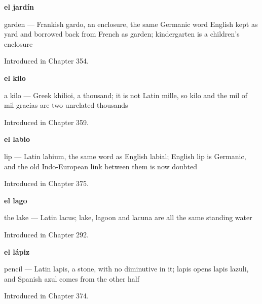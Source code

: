 \noindent\begin{minipage}[t]{\linewidth}
\raggedright
\textbf{el jardín}\par
\small garden — Frankish gardo, an enclosure, the same Germanic word English kept as yard and borrowed back from French as garden; kindergarten is a children's enclosure\par
\footnotesize Introduced in Chapter 354.
\end{minipage}\par\medskip

\noindent\begin{minipage}[t]{\linewidth}
\raggedright
\textbf{el kilo}\par
\small a kilo — Greek khilioi, a thousand; it is not Latin mille, so kilo and the mil of mil gracias are two unrelated thousands\par
\footnotesize Introduced in Chapter 359.
\end{minipage}\par\medskip

\noindent\begin{minipage}[t]{\linewidth}
\raggedright
\textbf{el labio}\par
\small lip — Latin labium, the same word as English labial; English lip is Germanic, and the old Indo-European link between them is now doubted\par
\footnotesize Introduced in Chapter 375.
\end{minipage}\par\medskip

\noindent\begin{minipage}[t]{\linewidth}
\raggedright
\textbf{el lago}\par
\small the lake — Latin lacus; lake, lagoon and lacuna are all the same standing water\par
\footnotesize Introduced in Chapter 292.
\end{minipage}\par\medskip

\noindent\begin{minipage}[t]{\linewidth}
\raggedright
\textbf{el lápiz}\par
\small pencil — Latin lapis, a stone, with no diminutive in it; lapis opens lapis lazuli, and Spanish azul comes from the other half\par
\footnotesize Introduced in Chapter 374.
\end{minipage}\par\medskip


